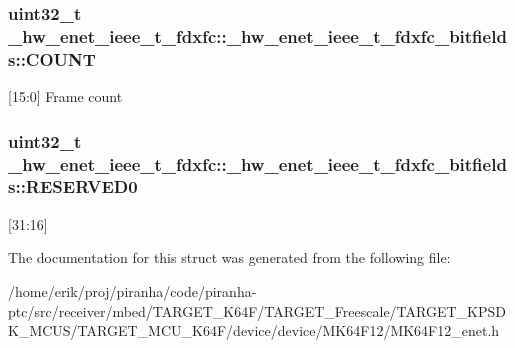 \subsubsection[{\texorpdfstring{C\+O\+U\+NT}{COUNT}}]{\setlength{\rightskip}{0pt plus 5cm}uint32\+\_\+t \+\_\+hw\+\_\+enet\+\_\+ieee\+\_\+t\+\_\+fdxfc\+::\+\_\+hw\+\_\+enet\+\_\+ieee\+\_\+t\+\_\+fdxfc\+\_\+bitfields\+::\+C\+O\+U\+NT}\hypertarget{struct__hw__enet__ieee__t__fdxfc_1_1__hw__enet__ieee__t__fdxfc__bitfields_aefd1cbcd07ff1b19ddb1281a29639993}{}\label{struct__hw__enet__ieee__t__fdxfc_1_1__hw__enet__ieee__t__fdxfc__bitfields_aefd1cbcd07ff1b19ddb1281a29639993}
\mbox{[}15\+:0\mbox{]} Frame count 
\subsubsection[{\texorpdfstring{R\+E\+S\+E\+R\+V\+E\+D0}{RESERVED0}}]{\setlength{\rightskip}{0pt plus 5cm}uint32\+\_\+t \+\_\+hw\+\_\+enet\+\_\+ieee\+\_\+t\+\_\+fdxfc\+::\+\_\+hw\+\_\+enet\+\_\+ieee\+\_\+t\+\_\+fdxfc\+\_\+bitfields\+::\+R\+E\+S\+E\+R\+V\+E\+D0}\hypertarget{struct__hw__enet__ieee__t__fdxfc_1_1__hw__enet__ieee__t__fdxfc__bitfields_a5708f7700e9866ff4e7748ab8504dcf7}{}\label{struct__hw__enet__ieee__t__fdxfc_1_1__hw__enet__ieee__t__fdxfc__bitfields_a5708f7700e9866ff4e7748ab8504dcf7}
\mbox{[}31\+:16\mbox{]} 

The documentation for this struct was generated from the following file\+:\begin{DoxyCompactItemize}
\item 
/home/erik/proj/piranha/code/piranha-\/ptc/src/receiver/mbed/\+T\+A\+R\+G\+E\+T\+\_\+\+K64\+F/\+T\+A\+R\+G\+E\+T\+\_\+\+Freescale/\+T\+A\+R\+G\+E\+T\+\_\+\+K\+P\+S\+D\+K\+\_\+\+M\+C\+U\+S/\+T\+A\+R\+G\+E\+T\+\_\+\+M\+C\+U\+\_\+\+K64\+F/device/device/\+M\+K64\+F12/M\+K64\+F12\+\_\+enet.\+h\end{DoxyCompactItemize}
